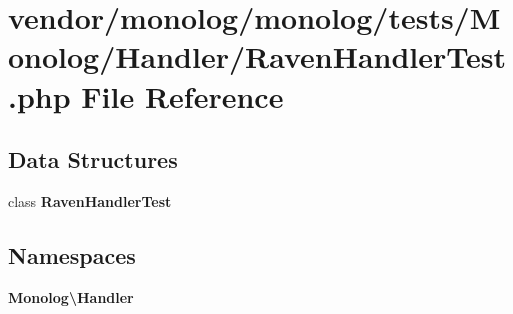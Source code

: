 \section{vendor/monolog/monolog/tests/\+Monolog/\+Handler/\+Raven\+Handler\+Test.php File Reference}
\label{_raven_handler_test_8php}
\subsection*{Data Structures}
\begin{DoxyCompactItemize}
\item 
class {\bf Raven\+Handler\+Test}
\end{DoxyCompactItemize}
\subsection*{Namespaces}
\begin{DoxyCompactItemize}
\item 
 {\bf Monolog\textbackslash{}\+Handler}
\end{DoxyCompactItemize}
